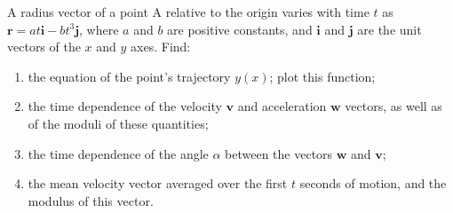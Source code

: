 
\item A radius vector of a point A relative to the origin varies with time \( t \) as \( \mathbf{r} = at\mathbf{i} - bt^3\mathbf{j} \), where \( a \) and \( b \) are positive constants, and \( \mathbf{i} \) and \( \mathbf{j} \) are the unit vectors of the \( x \) and \( y \) axes. Find:
    \begin{enumerate}
        \item the equation of the point's trajectory \( y(x) \); plot this function;
        \item the time dependence of the velocity \( \mathbf{v} \) and acceleration \( \mathbf{w} \) vectors, as well as of the moduli of these quantities;
        \item the time dependence of the angle \( \alpha \) between the vectors \( \mathbf{w} \) and \( \mathbf{v} \);
        \item the mean velocity vector averaged over the first \( t \) seconds of motion, and the modulus of this vector.
    \end{enumerate}


